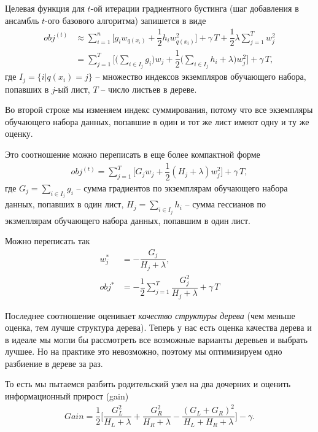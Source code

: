 \documentclass[%
	11pt,
	a4paper,
	utf8,
		]{article}
\begin{document}
Целевая функция для $ t $-ой итерации градиентного бустинга (шаг добавления в ансамбль $ t $-ого базового алгоритма) запишется в виде
\begin{align*}
	obj^{(t)} &\approx \sum_{i=1}^n \Big[ g_i w_{ q(x_i) } + \dfrac{1}{2}h_i w_{ q(x_i) }^2 \Big] + \gamma \, T + \dfrac{1}{2} \lambda \sum_{j=1}^T w_j^2 \\
	 &= \sum_{j=1}^T \Big[ \Big( \sum_{ i \in I_j } g_i \Big) w_j + \dfrac{1}{2} \Big( \sum_{i \in I_j} h_i +\lambda \Big) w_j^2 \Big] + \gamma \, T,
\end{align*}
где $ I_j = \{ i | q(x_i) = j \} $ -- множество индексов экземпляров обучающего набора, попавших в $ j $-ый лист, $ T $ -- число листьев в дереве.

Во второй строке мы изменяем индекс суммирования, потому что все экземпляры обучающего набора данных, попавшие в один и тот же лист имеют одну и ту же оценку.

Это соотношение можно переписать в еще более компактной форме
\begin{align*}
	obj^{(t)} = \sum_{j=1}^T \Big[ G_j w_j + \dfrac{1}{2} (H_j + \lambda)w_j^2 \Big] + \gamma \, T,
\end{align*}
где $ G_j = \sum_{i \in I_j} g_i $ -- сумма градиентов по экземплярам обучающего набора данных, попавших в один лист, $ H_j = \sum_{ i \in I_j } h_i $ -- сумма гессианов по экзмеплярам обучающего набора данных, попавшим в один лист.

Можно переписать так
\begin{align*}
	w_j^* &= - \dfrac{ G_j }{ H_j + \lambda }, \\
	obj^* &= - \dfrac{1}{2} \sum_{j=1}^T \dfrac{ G_j^2 }{ H_j + \lambda } + \gamma \, T
\end{align*}

Последнее соотношение оценивает \emph{качество структуры дерева} (чем меньше оценка, тем лучше структура дерева). Теперь у нас есть оценка качества дерева и в идеале мы могли бы рассмотреть все возможные варианты деревьев и выбрать лучшее. Но на практике это невозможно, поэтому мы оптимизируем одно разбиение в дереве за раз. 

То есть мы пытаемся разбить родительский узел на два дочерних и оценить информационный прирост (gain)
\begin{align*}
	Gain = \dfrac{1}{2} \Big[ \dfrac{G_L^2}{ H_L + \lambda } + \dfrac{G_R^2}{H_R + \lambda} - \dfrac{ (G_L + G_R)^2 }{ H_L +H_R +\lambda } \Big] - \gamma.
\end{align*}
\end{document}
